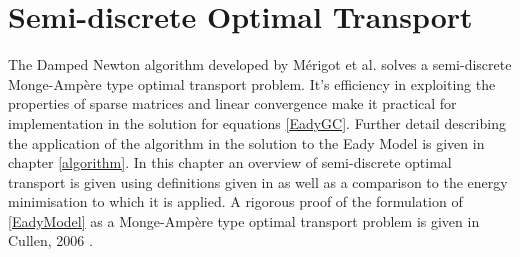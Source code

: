 \chapter{Semi-discrete Optimal Transport}
The Damped Newton algorithm developed by M\'{e}rigot et al. \cite{Merigot2017} solves a semi-discrete Monge-Amp\`{e}re type optimal transport problem. It's efficiency in exploiting the properties of sparse matrices and linear convergence \cite{Merigot2017} make it practical for implementation in the solution for equations \ref{EadyGC}. Further detail describing the application of the algorithm in the solution to the Eady Model is given in chapter \ref{algorithm}. In this chapter an overview of semi-discrete optimal transport is given using definitions given in \cite{Kitagawa2016, Merigot2017} as well as a comparison to the energy minimisation to which it is applied. A rigorous proof of the formulation of \ref{EadyModel} as a Monge-Amp\`{e}re type optimal transport problem is given in Cullen, 2006 \cite{Cullen2006a}.
